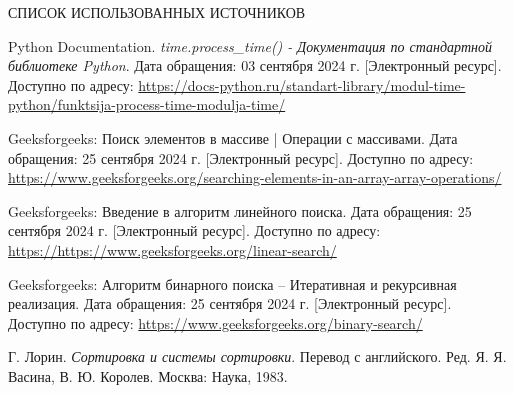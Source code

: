 \begin{center}
    \MakeUppercase{\large Список использованных источников}
\end{center}

\renewcommand{\refname}{}
\vspace{-11mm}

\begin{thebibliography}{9}
     Python Documentation. \textit{time.process\_time() - Документация по стандартной библиотеке Python}. Дата обращения: 03 сентября 2024 г. [Электронный ресурс]. Доступно по адресу: \url{https://docs-python.ru/standart-library/modul-time-python/funktsija-process-time-modulja-time/}
    
     Geeksforgeeks: Поиск элементов в массиве | Операции с массивами. Дата обращения: 25 сентября 2024 г. [Электронный ресурс]. Доступно по адресу: \url{https://www.geeksforgeeks.org/searching-elements-in-an-array-array-operations/}
    
     Geeksforgeeks: Введение в алгоритм линейного поиска. Дата обращения: 25 сентября 2024 г. [Электронный ресурс]. Доступно по адресу: \url{https://https://www.geeksforgeeks.org/linear-search/}
    
     Geeksforgeeks: Алгоритм бинарного поиска – Итеративная и рекурсивная реализация. Дата обращения: 25 сентября 2024 г. [Электронный ресурс]. Доступно по адресу: \url{https://www.geeksforgeeks.org/binary-search/}
    
     Г. Лорин. \textit{Сортировка и системы сортировки}. Перевод с английского. Ред. Я. Я. Васина, В. Ю. Королев. Москва: Наука, 1983.
  
\end{thebibliography}